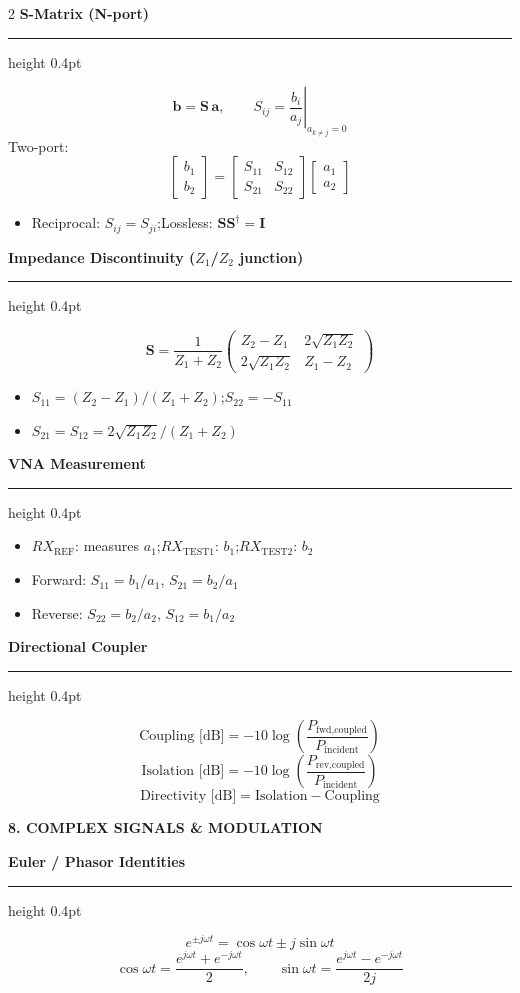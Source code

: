 \documentclass[10pt,a4paper]{article}
\newcommand{\sectionbox}[1]{%
  \vspace{3pt}%
  \noindent\colorbox{headerbg}{\parbox{\linewidth-2\fboxsep}%
    {\bfseries\small\color{white}\MakeUppercase{#1}}}%
  \vspace{1pt}%
}
\newcommand{\subsec}[1]{%
  \vspace{3pt}%
  {\small\bfseries\color{subseccolor}#1}%
  \vspace{1pt}\hrule height 0.4pt \vspace{2pt}%
}
\begin{document}
\begin{multicols}{2}
\subsec{S-Matrix (N-port)}
\[
\mathbf{b}=\mathbf{S}\,\mathbf{a},\qquad
S_{ij}=\left.\frac{b_i}{a_j}\right|_{a_{k\neq j}=0}
\]
Two-port:
\[
\begin{bmatrix}b_1\\b_2\end{bmatrix}=
\begin{bmatrix}S_{11}&S_{12}\\S_{21}&S_{22}\end{bmatrix}
\begin{bmatrix}a_1\\a_2\end{bmatrix}
\]
\begin{itemize}
  \item Reciprocal: $S_{ij}=S_{ji}$;\quad Lossless: $\mathbf{SS}^\dagger=\mathbf{I}$
\end{itemize}

\subsec{Impedance Discontinuity ($Z_1$/$Z_2$ junction)}
\[
\mathbf{S}=\frac{1}{Z_1+Z_2}
\begin{pmatrix}Z_2-Z_1 & 2\sqrt{Z_1Z_2}\\2\sqrt{Z_1Z_2} & Z_1-Z_2\end{pmatrix}
\]
\begin{itemize}
  \item $S_{11}=(Z_2-Z_1)/(Z_1+Z_2)$;\quad $S_{22}=-S_{11}$
  \item $S_{21}=S_{12}=2\sqrt{Z_1Z_2}/(Z_1+Z_2)$
\end{itemize}

\subsec{VNA Measurement}
\begin{itemize}
  \item $RX_\text{REF}$: measures $a_1$;\quad $RX_\text{TEST1}$: $b_1$;\quad $RX_\text{TEST2}$: $b_2$
  \item Forward: $S_{11}=b_1/a_1$,\; $S_{21}=b_2/a_1$
  \item Reverse: $S_{22}=b_2/a_2$,\; $S_{12}=b_1/a_2$
\end{itemize}

\subsec{Directional Coupler}
\[
\text{Coupling [dB]}=-10\log\!\left(\frac{P_\text{fwd,coupled}}{P_\text{incident}}\right)
\]
\[
\text{Isolation [dB]}=-10\log\!\left(\frac{P_\text{rev,coupled}}{P_\text{incident}}\right)
\]
\[
\text{Directivity [dB]}=\text{Isolation}-\text{Coupling}
\]

\sectionbox{8. Complex Signals \& Modulation}

\subsec{Euler / Phasor Identities}
\[
e^{\pm j\omega t}=\cos\omega t\pm j\sin\omega t
\]
\[
\cos\omega t=\frac{e^{j\omega t}+e^{-j\omega t}}{2},\qquad
\sin\omega t=\frac{e^{j\omega t}-e^{-j\omega t}}{2j}
\]


\end{multicols}
\end{document}
